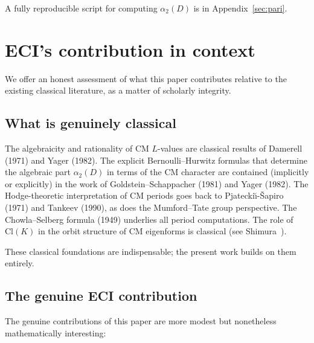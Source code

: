 \documentclass[12pt]{amsart}
\theoremstyle{definition}
\begin{document}
A fully reproducible script for computing $\alpha_2(D)$ is in
Appendix~\ref{sec:pari}.

\section{ECI's contribution in context}
\label{sec:positioning}

We offer an honest assessment of what this paper contributes relative to the
existing classical literature, as a matter of scholarly integrity.

\subsection{What is genuinely classical}

The algebraicity and rationality of CM $L$-values are classical results of
Damerell (1971) and Yager (1982).
The explicit Bernoulli--Hurwitz formulas that determine the algebraic part
$\alpha_2(D)$ in terms of the CM character are contained (implicitly or
explicitly) in the work of Goldstein--Schappacher (1981) and Yager (1982).
The Hodge-theoretic interpretation of CM periods goes back to
Pjatecki\u{\i}-\v{S}apiro (1971) and Tankeev (1990),
as does the Mumford--Tate group perspective.
The Chowla--Selberg formula (1949) underlies all period computations.
The role of $\mathrm{Cl}(K)$ in the orbit structure of CM eigenforms is
classical (see Shimura~\cite{CITE-NEEDED-Shimura1971}).

These classical foundations are indispensable; the present work builds
on them entirely.

\subsection{The genuine ECI contribution}

The genuine contributions of this paper are more modest but nonetheless
mathematically interesting:
\end{document}
